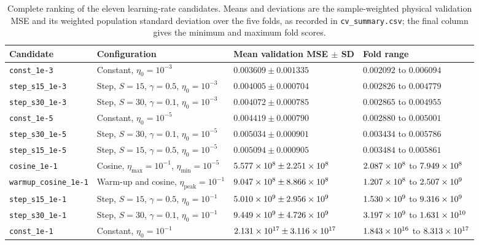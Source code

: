 \begin{table}[h!]
    \centering
    \small
    \setlength{\tabcolsep}{3pt}
    \begin{tabularx}{\linewidth}{@{}
        >{\raggedright\arraybackslash}X
        >{\raggedright\arraybackslash}X
        >{\centering\arraybackslash}X
        >{\centering\arraybackslash}X
        @{}}
        \hline
        Candidate & Configuration & Mean validation MSE $\pm$ SD & Fold range \\
        \hline
        \texttt{const\_1e-3} & Constant, $\eta_0=10^{-3}$ & $0.003609\pm0.001335$ & $0.002092$ to $0.006094$ \\
        \texttt{step\_s15\_1e-3} & Step, $S=15$, $\gamma=0.5$, $\eta_0=10^{-3}$ & $0.004005\pm0.000704$ & $0.002826$ to $0.004779$ \\
        \texttt{step\_s30\_1e-3} & Step, $S=30$, $\gamma=0.1$, $\eta_0=10^{-3}$ & $0.004072\pm0.000785$ & $0.002865$ to $0.004955$ \\
        \texttt{const\_1e-5} & Constant, $\eta_0=10^{-5}$ & $0.004419\pm0.000790$ & $0.002880$ to $0.005001$ \\
        \texttt{step\_s30\_1e-5} & Step, $S=30$, $\gamma=0.1$, $\eta_0=10^{-5}$ & $0.005034\pm0.000901$ & $0.003434$ to $0.005786$ \\
        \texttt{step\_s15\_1e-5} & Step, $S=15$, $\gamma=0.5$, $\eta_0=10^{-5}$ & $0.005094\pm0.000905$ & $0.003484$ to $0.005861$ \\
        \texttt{cosine\_1e-1} & Cosine, $\eta_{\max}=10^{-1}$, $\eta_{\min}=10^{-5}$ & $5.577\times 10^{8}\pm2.251\times 10^{8}$ & $2.087\times 10^{8}$ to $7.949\times 10^{8}$ \\
        \texttt{warmup\_cosine\_1e-1} & Warm-up and cosine, $\eta_{\mathrm{peak}}=10^{-1}$ & $9.047\times 10^{8}\pm8.866\times 10^{8}$ & $1.207\times 10^{8}$ to $2.507\times 10^{9}$ \\
        \texttt{step\_s15\_1e-1} & Step, $S=15$, $\gamma=0.5$, $\eta_0=10^{-1}$ & $5.010\times 10^{9}\pm2.956\times 10^{9}$ & $1.530\times 10^{9}$ to $9.316\times 10^{9}$ \\
        \texttt{step\_s30\_1e-1} & Step, $S=30$, $\gamma=0.1$, $\eta_0=10^{-1}$ & $9.449\times 10^{9}\pm4.726\times 10^{9}$ & $3.197\times 10^{9}$ to $1.631\times 10^{10}$ \\
        \texttt{const\_1e-1} & Constant, $\eta_0=10^{-1}$ & $2.131\times 10^{17}\pm3.116\times 10^{17}$ & $1.843\times 10^{16}$ to $8.313\times 10^{17}$ \\
        \hline
    \end{tabularx}
    \caption{Complete ranking of the eleven learning-rate candidates. Means and deviations are the sample-weighted physical validation MSE and its weighted population standard deviation over the five folds, as recorded in \texttt{cv\_summary.csv}; the final column gives the minimum and maximum fold scores.}
    \label{tab:04_learning_rate_results}
\end{table}
\vspace{2ex}

